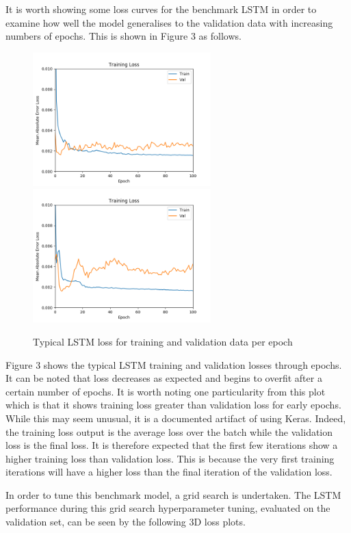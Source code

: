 \documentclass{article}
\begin{document}
It is worth showing some loss curves for the benchmark LSTM in order to examine how well the model generalises to the validation data with increasing numbers of epochs. This is shown in Figure 3 as follows.

\begin{figure}[!h]
	\includegraphics[width=195pt]{lstm_plot1.png}
	\includegraphics[width=195pt]{lstm_plot2.png}
	\caption{Typical LSTM loss for training and validation data per epoch}
\end{figure}

Figure 3 shows the typical LSTM training and validation losses through epochs. It can be noted that loss decreases as expected and begins to overfit after a certain number of epochs. It is worth noting one particularity from this plot which is that it shows training loss greater than validation loss for early epochs. While this may seem unusual, it is a documented artifact of using Keras. Indeed, the training loss output is the average loss over the batch while the validation loss is the final loss. It is therefore expected that the first few iterations show a higher training loss than validation loss. This is because the very first training iterations will have a higher loss than the final iteration of the validation loss. 

In order to tune this benchmark model, a grid search is undertaken. The LSTM performance during this grid search hyperparameter tuning, evaluated on the validation set, can be seen by the following 3D loss plots.
\end{document}
